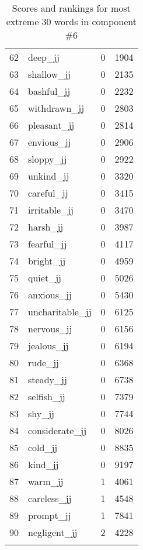 \begin{longtable}[!htbp]{| rlr@{.}l |}
    62 & deep\_jj & 0 & 1904 \\
    63 & shallow\_jj & 0 & 2135 \\
    64 & bashful\_jj & 0 & 2232 \\
    65 & withdrawn\_jj & 0 & 2803 \\
    66 & pleasant\_jj & 0 & 2814 \\
    67 & envious\_jj & 0 & 2906 \\
    68 & sloppy\_jj & 0 & 2922 \\
    69 & unkind\_jj & 0 & 3320 \\
    70 & careful\_jj & 0 & 3415 \\
    71 & irritable\_jj & 0 & 3470 \\
    72 & harsh\_jj & 0 & 3987 \\
    73 & fearful\_jj & 0 & 4117 \\
    74 & bright\_jj & 0 & 4959 \\
    75 & quiet\_jj & 0 & 5026 \\
    76 & anxious\_jj & 0 & 5430 \\
    77 & uncharitable\_jj & 0 & 6125 \\
    78 & nervous\_jj & 0 & 6156 \\
    79 & jealous\_jj & 0 & 6194 \\
    80 & rude\_jj & 0 & 6368 \\
    81 & steady\_jj & 0 & 6738 \\
    82 & selfish\_jj & 0 & 7379 \\
    83 & shy\_jj & 0 & 7744 \\
    84 & considerate\_jj & 0 & 8026 \\
    85 & cold\_jj & 0 & 8835 \\
    86 & kind\_jj & 0 & 9197 \\
    87 & warm\_jj & 1 & 4061 \\
    88 & careless\_jj & 1 & 4548 \\
    89 & prompt\_jj & 1 & 7841 \\
    90 & negligent\_jj & 2 & 4228 \\
    \hline
    \caption{Scores and rankings for most extreme 30 words in component \#6} \\
\end{longtable}
